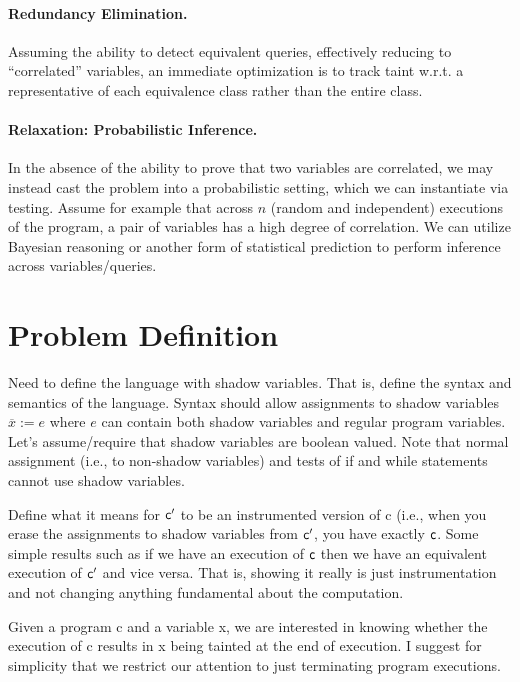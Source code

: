 \documentclass[]{article}
\begin{document}
{\paragraph{Redundancy Elimination.} Assuming the ability to detect equivalent queries, effectively reducing to ``correlated'' variables, an immediate optimization is to track taint w.r.t. a representative of each equivalence class rather than the entire class.

\paragraph{Relaxation: Probabilistic Inference.} In the absence of the ability to prove that two variables are correlated, we may instead cast the problem into a probabilistic setting, which we can instantiate via testing. Assume for example that across $n$ (random and independent) executions of the program, a pair of variables has a high degree of correlation. We can utilize Bayesian reasoning or another form of statistical prediction to perform inference across variables/queries.

\section{Problem Definition}
Need to define the language with shadow variables. That is,
  define the syntax and semantics of the language. Syntax should allow
assignments to shadow variables $\overline{x} := e$ where $e$ can
contain both shadow variables and regular program variables. Let's
assume/require that shadow variables are boolean valued. Note that
normal assignment (i.e., to non-shadow variables) and tests of if and
while statements cannot use shadow variables.

Define what it means for ${\sf c}'$ to be an instrumented version of {\sf c} (i.e.,
when you erase the assignments to shadow variables from ${\sf c}'$,
you have exactly ${\sf c}$. Some simple results such as if we have an
execution of ${\sf c}$ then we have an equivalent execution of ${\sf
  c}'$ and vice versa. That is, showing it really is just
instrumentation and not changing anything fundamental about the computation.

Given a program {\sf c} and a variable {\sf x}, we are interested in
knowing whether the execution of {\sf c} results in {\sf x} being
tainted at the end of execution. I suggest for simplicity that
  we restrict our attention to just terminating program executions.

}
\end{document}
